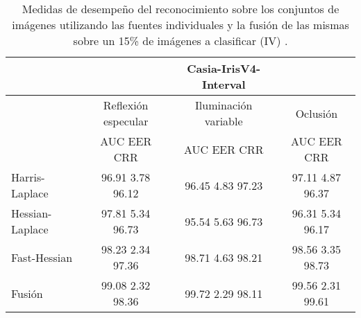 \begin{table}[h]
\begin{center}
\begin{tabular}{@{}lccc@{}}
\toprule
&& Casia-IrisV4-Interval & \\ \hline
&Reflexión especular		&  	Iluminación variable		& Oclusión \\ \hline
&AUC  \phantom{aa} EER  \phantom{aa} CRR &  	AUC  \phantom{aa} EER  \phantom{aa} CRR		& AUC  \phantom{aa} EER  \phantom{aa} CRR \\ \hline
Harris-Laplace& 96.91 \phantom{aa} 3.78  \phantom{aa} 96.12 &  	96.45 \phantom{aa} 4.83  \phantom{aa}97.23		& 97.11 \phantom{aa} 4.87 \phantom{aa} 96.37 \\
Hessian-Laplace& 97.81 \phantom{aa} 5.34  \phantom{aa} 96.73 &  	95.54 \phantom{aa} 5.63 \phantom{aa} 96.73 & 96.31 \phantom{aa} 5.34 \phantom{aa} 96.17\\
Fast-Hessian& 98.23  \phantom{aa}2.34 \phantom{aa}  97.36 &  	98.71 \phantom{aa} 4.63 \phantom{aa}98.21		& 98.56  \phantom{aa}3.35 \phantom{aa} 98.73 \\
Fusión& 99.08 \phantom{aa} 2.32  \phantom{aa}98.36 &  	99.72  \phantom{aa}2.29 \phantom{aa} 98.11		& 99.56 \phantom{aa} 2.31  \phantom{aa}99.61 \\ \hline

\end{tabular}
\end{center}
\caption{Medidas de desempeño del reconocimiento sobre los conjuntos de imágenes utilizando las fuentes individuales y la fusión de las mismas sobre un 15\% de imágenes a clasificar (IV) .}
\label{my_tabla}
\end{table}


